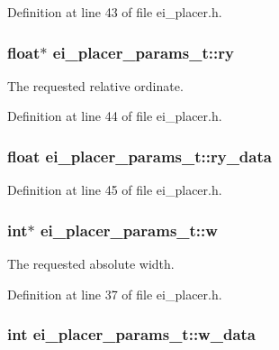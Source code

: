 Definition at line 43 of file ei\-\_\-placer.\-h.

\hypertarget{structei__placer__params__t_a71edc6f4e83a892a55cbe3430d7cf1b7}{
\subsubsection[{ry}]{\setlength{\rightskip}{0pt plus 5cm}float$\ast$ ei\-\_\-placer\-\_\-params\-\_\-t\-::ry}}\label{structei__placer__params__t_a71edc6f4e83a892a55cbe3430d7cf1b7}


The requested relative ordinate. 



Definition at line 44 of file ei\-\_\-placer.\-h.

\hypertarget{structei__placer__params__t_a2055b1dcc667420769afe2121c964242}{
\subsubsection[{ry\-\_\-data}]{\setlength{\rightskip}{0pt plus 5cm}float ei\-\_\-placer\-\_\-params\-\_\-t\-::ry\-\_\-data}}\label{structei__placer__params__t_a2055b1dcc667420769afe2121c964242}


Definition at line 45 of file ei\-\_\-placer.\-h.

\hypertarget{structei__placer__params__t_a62adb2fa9ee168ab6959d84a3baa4b91}{
\subsubsection[{w}]{\setlength{\rightskip}{0pt plus 5cm}int$\ast$ ei\-\_\-placer\-\_\-params\-\_\-t\-::w}}\label{structei__placer__params__t_a62adb2fa9ee168ab6959d84a3baa4b91}


The requested absolute width. 



Definition at line 37 of file ei\-\_\-placer.\-h.

\hypertarget{structei__placer__params__t_ae94c6bc5f4422f5fd7418e7a6e428a8a}{
\subsubsection[{w\-\_\-data}]{\setlength{\rightskip}{0pt plus 5cm}int ei\-\_\-placer\-\_\-params\-\_\-t\-::w\-\_\-data}}\label{structei__placer__params__t_ae94c6bc5f4422f5fd7418e7a6e428a8a}


